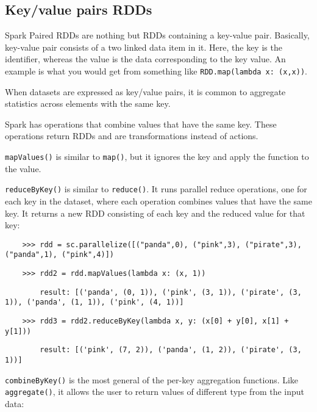 \subsection{Key/value pairs RDDs}


Spark Paired RDDs are nothing but RDDs containing a key-value pair. Basically, key-value pair consists of a two linked data item in it. Here, the key is the identifier, whereas the value is the data corresponding to the key value. An example is what you would get from something like \texttt{RDD.map(lambda x: (x,x))}.

When datasets are expressed as key/value pairs, it is common to aggregate statistics across elements with the same key.

Spark has operations that combine values that have the same key. These operations return RDDs and are transformations instead of actions.


\texttt{mapValues()} is similar to \texttt{map()}, but it ignores the key and apply the function to the value.

\texttt{reduceByKey()} is similar to \texttt{reduce()}. It runs parallel reduce operations, one for each key in the dataset, where each operation combines values that have the same key. It returns a new RDD consisting of each key and the reduced value for that key:

\begin{lstlisting}
    >>> rdd = sc.parallelize([("panda",0), ("pink",3), ("pirate",3), ("panda",1), ("pink",4)])
\end{lstlisting}

\begin{lstlisting}
    >>> rdd2 = rdd.mapValues(lambda x: (x, 1))
\end{lstlisting}

\begin{lstlisting}
        result: [('panda', (0, 1)), ('pink', (3, 1)), ('pirate', (3, 1)), ('panda', (1, 1)), ('pink', (4, 1))]
\end{lstlisting}

\begin{lstlisting}
    >>> rdd3 = rdd2.reduceByKey(lambda x, y: (x[0] + y[0], x[1] + y[1]))
\end{lstlisting}

\begin{lstlisting}
        result: [('pink', (7, 2)), ('panda', (1, 2)), ('pirate', (3, 1))]
\end{lstlisting}


\texttt{combineByKey()} is the most general of the per-key aggregation functions. Like \texttt{aggregate()}, it allows the user to return values of different type from the input data:

